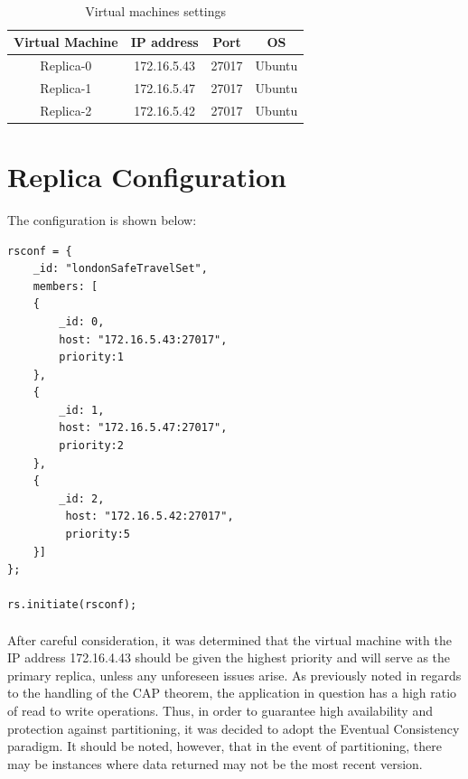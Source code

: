 \paragraph{}

\begin{table} [H]
	\begin{center}
\begin{tabular}{|c|c|c|c|}
	\hline
	Virtual Machine & IP address & Port & OS \\
	\hline \hline
	Replica-0& 172.16.5.43 & 27017 &Ubuntu  \\
	\hline
	Replica-1& 172.16.5.47 & 27017 &Ubuntu  \\
	\hline
	Replica-2& 172.16.5.42 & 27017 &Ubuntu  \\
	\hline
\end{tabular}
\end{center}
\caption{\label{demo-table}Virtual machines settings}
\end{table}

\section{Replica Configuration}
The configuration is shown below:

\begin{lstlisting}
rsconf = {
	_id: "londonSafeTravelSet",
	members: [
	{
		_id: 0,
	 	host: "172.16.5.43:27017",
	 	priority:1
 	},
	{
		_id: 1,
	 	host: "172.16.5.47:27017",
	  	priority:2
  	},
	{
		_id: 2,
		 host: "172.16.5.42:27017",
		 priority:5
	}]
};

rs.initiate(rsconf);
\end{lstlisting}

\paragraph{}
After careful consideration, it was determined that the virtual machine with 
the IP address 172.16.4.43 should be given the highest priority and will serve 
as the primary replica, unless any unforeseen issues arise. As previously noted 
in regards to the handling of the CAP theorem, the application in question has 
a high ratio of read to write operations. Thus, in order to guarantee high 
availability and protection against partitioning, it was decided to adopt the 
Eventual Consistency paradigm. It should be noted, however, that in the event 
of partitioning, there may be instances where data returned may not be the most 
recent version.

